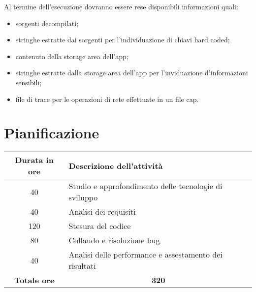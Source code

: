 Al termine dell'esecuzione dovranno essere rese disponibili informazioni quali:
\begin{itemize}
    \setlength\itemsep{0.1em}
    \item sorgenti decompilati;
    \item stringhe estratte dai sorgenti per l'individuazione di chiavi hard coded;
    \item contenuto della storage area dell'app;
    \item stringhe estratte dalla storage area dell'app per l'inviduazione d'informazioni sensibili;
    \item file di trace per le operazioni di rete effettuate in un file cap.
\end{itemize}

\section{Pianificazione}\label{sec:pianificazione}
\begin{tabularx}{\textwidth}{|c|X|}
    \hline
    \textbf{Durata in ore} & \textbf{Descrizione dell'attività} \\\hline
    40 & Studio e approfondimento delle tecnologie di sviluppo \\\hline
    40 & Analisi dei requisiti \\\hline
    120 & Stesura del codice \\\hline
    80 & Collaudo e risoluzione bug \\\hline
    40 & Analisi delle performance e assestamento dei risultati \\\hline
    \textbf{Totale ore} & \multicolumn{1}{|c|}{\textbf{320}} \\\hline
\end{tabularx}